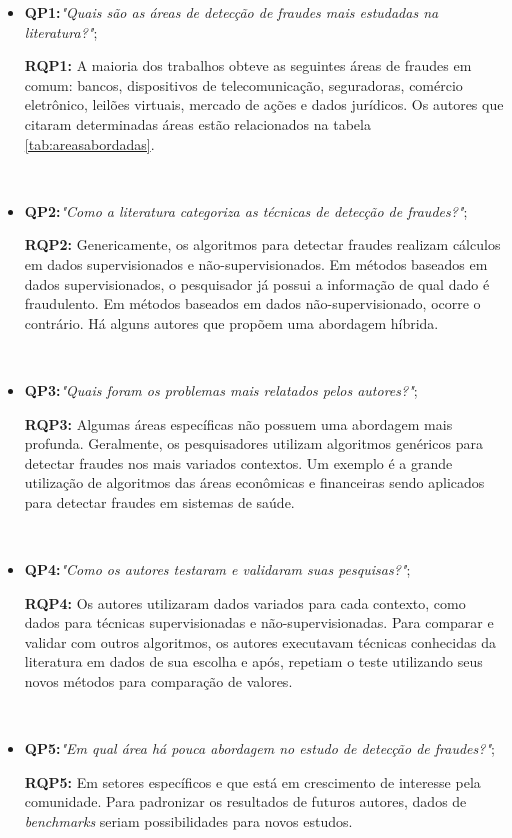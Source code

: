 \documentclass[smallextended]{svjour3}
\begin{document}
\begin{itemize}
	\item \textbf{QP1:}\textit{"Quais são as áreas de detecção de fraudes mais estudadas na literatura?"};
	
	\textbf{RQP1:} A maioria dos trabalhos obteve as seguintes áreas de fraudes em comum: bancos, dispositivos de telecomunicação, seguradoras, comércio eletrônico, leilões virtuais, mercado de ações e dados jurídicos. Os autores que citaram determinadas áreas estão relacionados na tabela \ref{tab:areasabordadas}.
	
	\
	\item \textbf{QP2:}\textit{"Como a literatura categoriza as técnicas de detecção de fraudes?"};
	
	\textbf{RQP2:} Genericamente, os algoritmos para detectar fraudes realizam cálculos em dados supervisionados e não-supervisionados. Em métodos baseados em dados supervisionados, o pesquisador já possui a informação de qual dado é fraudulento. Em métodos baseados em dados não-supervisionado, ocorre o contrário. Há alguns autores que propõem uma abordagem híbrida.
	
	\
	\item \textbf{QP3:}\textit{"Quais foram os problemas mais relatados pelos autores?"};
	
	\textbf{RQP3:} Algumas áreas específicas não possuem uma abordagem mais profunda. Geralmente, os pesquisadores utilizam algoritmos genéricos para detectar fraudes nos mais variados contextos. Um exemplo é a grande utilização de algoritmos das áreas econômicas e financeiras sendo aplicados para detectar fraudes em sistemas de saúde.
	
	\
	\item \textbf{QP4:}\textit{"Como os autores testaram e validaram suas pesquisas?"};
	
	\textbf{RQP4:} Os autores utilizaram dados variados para cada contexto, como dados para técnicas supervisionadas e não-supervisionadas. Para comparar e validar com outros algoritmos, os autores executavam técnicas conhecidas da literatura em dados de sua escolha e após, repetiam o teste utilizando seus novos métodos para comparação de valores.
	
	\
	\item \textbf{QP5:}\textit{"Em qual área há pouca abordagem no estudo de detecção de fraudes?"};
	
	\textbf{RQP5:} Em setores específicos e que está em crescimento de interesse pela comunidade. Para padronizar os resultados de futuros autores, dados de \emph{benchmarks} seriam possibilidades para novos estudos.
	

\end{itemize}
\end{document}
